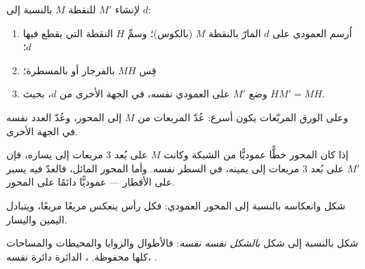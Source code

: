 \begin{method}\label{met:g6:symmetry:construct}
لإنشاء  $M'$ للنقطة $M$ بالنسبة إلى  $d$:
\begin{enumerate}
  \item اُرسم العمودي على $d$ المارّ بالنقطة $M$ (بالكوس)؛ وسمِّ
        $H$ النقطة التي يقطع فيها $d$؛
  \item قِس $MH$ بالفرجار أو بالمسطرة؛
  \item وضع $M'$ على العمودي نفسه، في الجهة الأخرى من $d$،
        بحيث $HM' = MH$.
\end{enumerate}
وعلى الورق المربّعات يكون أسرع: عُدّ المربعات من $M$ إلى المحور،
وعُدّ العدد نفسه في الجهة الأخرى.
\end{method}

\begin{example}\label{ex:g6:symmetry:grid}
إذا كان المحور خطًّا عموديًّا من الشبكة وكانت $M$ على بُعد $3$ مربعات إلى يساره،
فإن $M'$ على بُعد $3$ مربعات إلى يمينه، في السطر نفسه. وأما المحور
المائل، فالعدّ فيه يسير على الأقطار --- عموديًّا دائمًا على
المحور.
\end{example}

\begin{omfigure}

{\small شكل وانعكاسه بالنسبة إلى المحور العمودي: فكل
رأس ينعكس مربعًا مربعًا، ويتبادل اليمين واليسار.}
\end{omfigure}

\begin{proposition}\label{prop:g6:symmetry:preserved}
 شكل بالنسبة إلى  شكل \emph{بالشكل نفسه
 نفسه}: فالأطوال والزوايا والمحيطات والمساحات كلها
محفوظة.   ،  الدائرة دائرة
 نفسه،   .
\end{proposition}
\admitted

